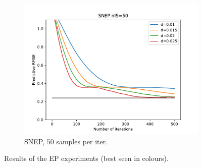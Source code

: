 \begin{landscape}
\begin{figure}[ht]
\begin{subfigure}[b]{0.45\textwidth}
		\includegraphics[width=\textwidth]{figures/snep/rms-snep-nis50}
		\caption{SNEP, 50 samples per iter.}
		\label{res-snep-50}
	\end{subfigure}		
%
\caption{\label{fig-res-snep}Results of the EP experiments (best seen in colours).}
\end{figure}
\end{landscape}

